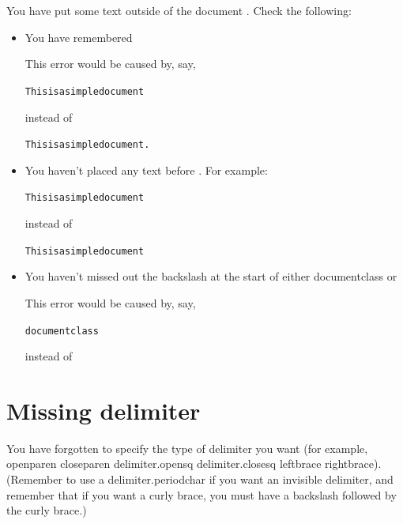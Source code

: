 You have put some text outside of the document 
.  Check the following:
\begin{itemize}
\item You have remembered \verb||

This error would be caused by, say,
\begin{alltt}
\wrong
This is a simple document
\end{alltt}
instead of
\begin{alltt}

\correct
This is a simple document.
\end{alltt}

\item You haven't placed any text before \verb||. 
For example:
\begin{alltt}

This is a simple document\wrong 
{}
\end{alltt}
instead of
\begin{alltt}

\correct
This is a simple document
\end{alltt}

\item You haven't missed out the backslash at the start of either 
\gls{documentclass} or 

This error would be caused by, say,
\begin{alltt}\wrong
documentclass
\end{alltt}
instead of
\begin{alltt}\correct
{}
\end{alltt}
\end{itemize}


\section{Missing delimiter}

You have forgotten to specify the type of delimiter you want (for
example, 
\gls{openparen} \gls{closeparen} \gls{delimiter.opensq} \gls{delimiter.closesq}
\gls{leftbrace} \gls{rightbrace}). (Remember to use a \gls{delimiter.periodchar} if you want 
an invisible delimiter, and remember that if you want a 
curly brace, you must have a backslash followed by the curly brace.)

